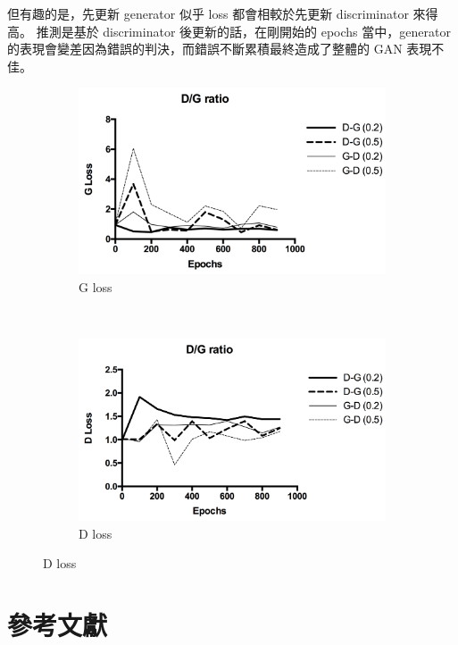 \documentclass[final,3p]{elsarticle}
\begin{document}
	但有趣的是，先更新 generator 似乎 loss 都會相較於先更新 discriminator 來得高。
	推測是基於 discriminator 後更新的話，在剛開始的 epochs 當中，generator 的表現會變差因為錯誤的判決，而錯誤不斷累積最終造成了整體的 GAN 表現不佳。
	\begin{figure}[H]
		\centering
		\begin{subfigure}{.48\textwidth}
			\centering
			\includegraphics[width=\linewidth]{images/g_loss_dg_gd}
			\caption{G loss}
		\end{subfigure}
		~
		\begin{subfigure}{.48\textwidth}
			\centering
			\includegraphics[width=\linewidth]{images/d_loss_dg_gd}
			\caption{D loss}
		\end{subfigure}
		\label{fig:dg_gd_loss}
	\end{figure}
		

\nocite{Wasserst52:online} 



\section{參考文獻}


	
\end{document}
